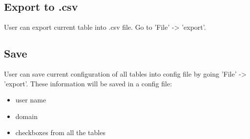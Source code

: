 \subsection*{Export to .csv}
User can export current table into .csv file. Go to 'File' -> 'export'.

\subsection*{Save}
User can save current configuration of all tables into config file by going 'File' -> 'export'. These information will be saved in a config file:

\begin{itemize}
\item user name
\item domain
\item checkboxes from all the tables
\end{itemize}
